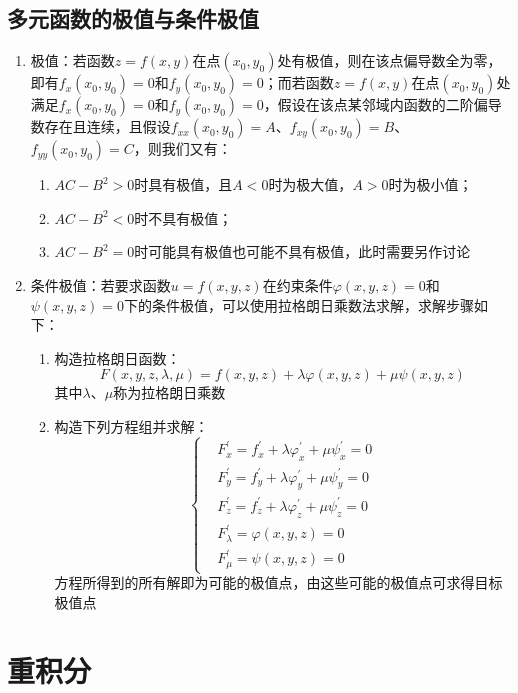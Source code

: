 \documentclass[12pt,a4paper,UTF8]{book}
\begin{document}
\subsection{多元函数的极值与条件极值}
\begin{enumerate}
\item 极值：若函数$z=f\left(x,y\right)$在点$\left(x_0,y_0\right)$处有极值，则在该点偏导数全为零，即有$f_x\left(x_0,y_0\right)=0$和$f_y\left(x_0,y_0\right)=0$；而若函数$z=f\left(x,y\right)$在点$\left(x_0,y_0\right)$处满足$f_x\left(x_0,y_0\right)=0$和$f_y\left(x_0,y_0\right)=0$，假设在该点某邻域内函数的二阶偏导数存在且连续，且假设$f_{xx}\left(x_0,y_0\right)=A$、$f_{xy}\left(x_0,y_0\right)=B$、$f_{yy}\left(x_0,y_0\right)=C$，则我们又有：
\begin{enumerate}
\item $AC-B^2>0$时具有极值，且$A<0$时为极大值，$A>0$时为极小值；
\item $AC-B^2<0$时不具有极值；
\item $AC-B^2=0$时可能具有极值也可能不具有极值，此时需要另作讨论
\end{enumerate}
\item 条件极值：若要求函数$u=f\left(x,y,z\right)$在约束条件$\varphi\left(x,y,z\right)=0$和$\psi\left(x,y,z\right)=0$下的条件极值，可以使用拉格朗日乘数法求解，求解步骤如下：
\begin{enumerate}
\item 构造拉格朗日函数：
\[F\left(x,y,z,\lambda,\mu\right)=f\left(x,y,z\right)+\lambda\varphi\left(x,y,z\right)+\mu\psi\left(x,y,z\right)\]
其中$\lambda$、$\mu$称为拉格朗日乘数
\item 构造下列方程组并求解：
\[\left\{\begin{aligned}
&F_x^{\prime}=f_x^{\prime}+\lambda\varphi_x^{\prime}+\mu\psi_x^{\prime}=0\\
&F_y^{\prime}=f_y^{\prime}+\lambda\varphi_y^{\prime}+\mu\psi_y^{\prime}=0\\
&F_z^{\prime}=f_z^{\prime}+\lambda\varphi_z^{\prime}+\mu\psi_z^{\prime}=0\\
&F_{\lambda}^{\prime}=\varphi\left(x,y,z\right)=0\\
&F_{\mu}^{\prime}=\psi\left(x,y,z\right)=0
\end{aligned}\right.\]
方程所得到的所有解即为可能的极值点，由这些可能的极值点可求得目标极值点
\end{enumerate}
\end{enumerate}


\section{重积分}
\end{document}
